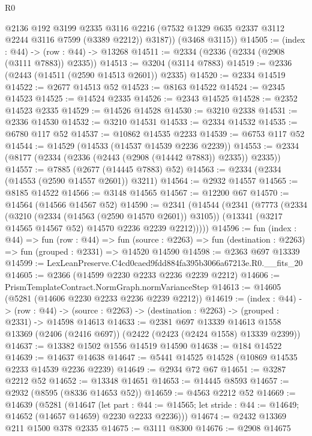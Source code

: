 \begin{lexlean}{R0}
\begin{coremodule}
          @2136
          @192
          @3199
          @2335
          @3116
          @2216
          (@7532 @1329 @635 @2337 @3112 @2244 @3116 @7599 (@3389 @2212))
          @3187))
      (@3468 @3115))
@14505 := (index : @44) -> (row : @44) -> @13268
@14511 := @2334 (@2336 (@2334 (@2908 (@3111 @7883)) @2335))
@14513 := @3204 (@3114 @7883)
@14519 := @2336 (@2443 (@14511 (@2590 @14513 @2601)) @2335)
@14520 := @2334 @14519
@14522 := @2677 @14513 @52
@14523 := @8163 @14522
@14524 := @2345 @14523
@14525 := @14524 @2335
@14526 := @2343 @14525
@14528 := @2352 @14523 @2335
@14529 := @14526 @14528
@14530 := @3210 @2338
@14531 := @2336 @14530
@14532 := @3210 @14531
@14533 := @2334 @14532
@14535 := @6780 @117 @52
@14537 := @10862 @14535 @2233
@14539 := @6753 @117 @52
@14544 := @14529 (@14533 (@14537 @14539 @2236 @2239))
@14553 := @2334 (@8177 (@2334 (@2336 (@2443 (@2908 (@14442 @7883)) @2335)) @2335))
@14557 := @7885 (@2677 (@14445 @7883) @52)
@14563 := @2334 (@2334 (@14553 (@2590 @14557 @2601)) @3211)
@14564 := @2932 @14557
@14565 := @8185 @14522
@14566 := @3148 @14565
@14567 := @12200 @67
@14570 := @14564 (@14566 @14567 @52)
@14590 := @2341
    (@14544
      (@2341
        (@7773
          (@2334
            (@3210 (@2334 (@14563 (@2590 @14570 @2601)) @3105))
            (@13341 (@3217 @14565 @14567 @52) @14570 @2236 @2239 @2212)))))
@14596 := fun (index : @44) =>
  fun (row : @44) =>
  fun (source : @2263) => fun (destination : @2263) => fun (grouped : @2331) => @14520 @14590
@14598 := @2363 @697 @13339
@14599 := LexLeanPreserve.C4cd0caed9fdd884fa395b3066a67213e.R0.__fits_20
@14605 := @2366 (@14599 @2230 @2233 @2236 @2239 @2212)
@14606 := PrismTemplateContract.NormGraph.normVarianceStep
@14613 := @14605 (@5281 (@14606 @2230 @2233 @2236 @2239 @2212))
@14619 := (index : @44) ->
  (row : @44) -> (source : @2263) -> (destination : @2263) -> (grouped : @2331) -> @14598 @14613
@14633 := @2381
    @697
    @13339
    @14613
    @1558
    @13369
    (@2406 (@2416 @697))
    (@2422 (@2423 (@2424 @1558) @13339 @2399))
@14637 := @13382 @1502 @1556 @14519 @14590
@14638 := @184 @14522
@14639 := @14637 @14638
@14647 := @5441 @14525 @14528 (@10869 @14535 @2233 @14539 @2236 @2239)
@14649 := @2934 @72 @67
@14651 := @3287 @2212 @52
@14652 := @13348 @14651
@14653 := @14445 @8593
@14657 := @2932 (@8595 (@8336 @14653 @52))
@14659 := @4563 @2212 @52
@14669 := @14639
    (@5281
      (@14647
        (let part : @44 := @14565;
        let stride : @44 := @14649; @14652 (@14657 @14659) @2230 @2233 @2236)))
@14674 := @2432 @13369 @211 @1500 @378 @2335
@14675 := @3111 @8300
@14676 := @2908 @14675

\end{coremodule}
\end{lexlean}
